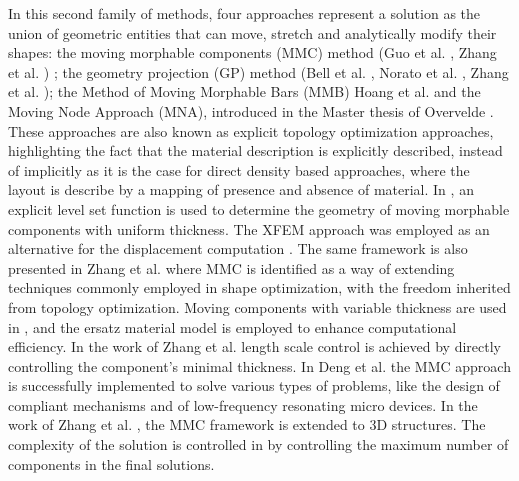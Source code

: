 In this second family of methods, four approaches represent a solution as the union of geometric entities that can move, stretch and analytically modify their shapes: the moving morphable components (MMC) method (Guo et al.  \cite{guo2014doing,guo2016explicit}, Zhang et al. \cite{zhang2016new,zhang2017new}) ; the geometry projection (GP) method (Bell et al. \cite{bell2012geometry}, Norato et al. \cite{norato2015geometry}, Zhang et al. \cite{zhang2016geometry}); the Method of Moving Morphable Bars (MMB) Hoang et al. \cite{hoang2017topology} and the Moving Node Approach (MNA), introduced in the Master thesis of Overvelde \cite{overvelde2012moving}. These approaches are also known as explicit topology optimization approaches, highlighting the fact that the material description is explicitly described, instead of implicitly as it is the case for direct density based approaches, where the layout is describe by a mapping of presence and absence of material. In \cite{guo2014doing}, an explicit level set function is used to determine the geometry of moving morphable components with uniform thickness. The XFEM approach was employed as an alternative for the displacement computation \cite{kreissl2012levelset,van2007stress,wei2010study}. The same framework is also presented in Zhang et al. \cite{zhang2016lagrangian} where MMC is identified as a way of extending techniques commonly employed in shape optimization, with the freedom inherited from topology optimization.  Moving components with variable thickness are used in \cite{zhang2016new}, and the ersatz material model is employed to enhance computational efficiency. In the work of Zhang et al. \cite{zhang2016minimum} length scale control is achieved by directly controlling the component's minimal thickness.
In Deng et al. \cite{deng2016design} the MMC approach is successfully implemented to solve various types of problems, like the design of compliant mechanisms and of low-frequency resonating micro devices.
In the work of Zhang et al. \cite{zhang2017new}, the MMC framework is extended to 3D structures.
The complexity of the solution is controlled in \cite{zhang2017structural} by controlling the maximum number of components in the final solutions.

